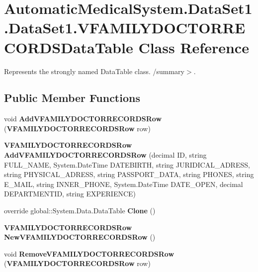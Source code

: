 \section{AutomaticMedicalSystem.DataSet1.DataSet1.VFAMILYDOCTORRECORDSDataTable Class Reference}
\label{class_automatic_medical_system_1_1_data_set1_1_1_v_f_a_m_i_l_y_d_o_c_t_o_r_r_e_c_o_r_d_s_data_table}
Represents the strongly named DataTable class. /summary$>$.  


\subsection*{Public Member Functions}
\begin{CompactItemize}
\item 
void \textbf{AddVFAMILYDOCTORRECORDSRow} ({\bf VFAMILYDOCTORRECORDSRow} row)\label{class_automatic_medical_system_1_1_data_set1_1_1_v_f_a_m_i_l_y_d_o_c_t_o_r_r_e_c_o_r_d_s_data_table_7eccba11ef578fcdb4f69afa6cccaa39}

\item 
{\bf VFAMILYDOCTORRECORDSRow} \textbf{AddVFAMILYDOCTORRECORDSRow} (decimal ID, string FULL\_\-NAME, System.DateTime DATEBIRTH, string JURIDICAL\_\-ADRESS, string PHYSICAL\_\-ADRESS, string PASSPORT\_\-DATA, string PHONES, string E\_\-MAIL, string INNER\_\-PHONE, System.DateTime DATE\_\-OPEN, decimal DEPARTMENTID, string EXPERIENCE)\label{class_automatic_medical_system_1_1_data_set1_1_1_v_f_a_m_i_l_y_d_o_c_t_o_r_r_e_c_o_r_d_s_data_table_d0355609b5e1eb14dd5a538a879bcd6a}

\item 
override global::System.Data.DataTable \textbf{Clone} ()\label{class_automatic_medical_system_1_1_data_set1_1_1_v_f_a_m_i_l_y_d_o_c_t_o_r_r_e_c_o_r_d_s_data_table_09f3a4554bc541254c0b8b448bfea5a5}

\item 
{\bf VFAMILYDOCTORRECORDSRow} \textbf{NewVFAMILYDOCTORRECORDSRow} ()\label{class_automatic_medical_system_1_1_data_set1_1_1_v_f_a_m_i_l_y_d_o_c_t_o_r_r_e_c_o_r_d_s_data_table_fd763b3f8de9597ac84e6fb34dac192b}

\item 
void \textbf{RemoveVFAMILYDOCTORRECORDSRow} ({\bf VFAMILYDOCTORRECORDSRow} row)\label{class_automatic_medical_system_1_1_data_set1_1_1_v_f_a_m_i_l_y_d_o_c_t_o_r_r_e_c_o_r_d_s_data_table_be27b7da2d137f89251c535e33ed3da6}

\end{CompactItemize}
